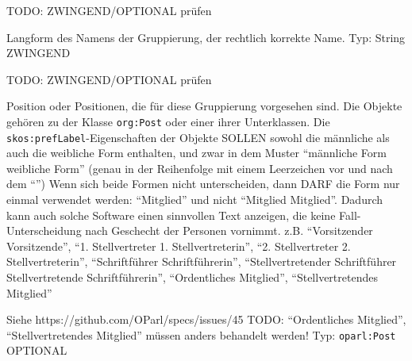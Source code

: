 \documentclass[,a4paper]{article}
\begin{document}
TODO: ZWINGEND/OPTIONAL prüfen

\begin{description}
\itemsep1pt\parskip0pt
\item[\texttt{nameLong}]
Langform des Namens der Gruppierung, der rechtlich korrekte Name. Typ:
String ZWINGEND
\end{description}

TODO: ZWINGEND/OPTIONAL prüfen

\begin{description}
\itemsep1pt\parskip0pt
\item[\texttt{post}]
Position oder Positionen, die für diese Gruppierung vorgesehen sind. Die
Objekte gehören zu der Klasse \texttt{org:Post} oder einer ihrer
Unterklassen. Die \texttt{skos:prefLabel}-Eigenschaften der Objekte
SOLLEN sowohl die männliche als auch die weibliche Form enthalten, und
zwar in dem Muster ``männliche Form \textbar{} weibliche Form'' (genau
in der Reihenfolge mit einem Leerzeichen vor und nach dem
``\textbar{}'') Wenn sich beide Formen nicht unterscheiden, dann DARF
die Form nur einmal verwendet werden: ``Mitglied'' und nicht ``Mitglied
\textbar{} Mitglied''. Dadurch kann auch solche Software einen
sinnvollen Text anzeigen, die keine Fall-Unterscheidung nach Geschecht
der Personen vornimmt. z.B. ``Vorsitzender \textbar{} Vorsitzende'',
``1. Stellvertreter \textbar{} 1. Stellvertreterin'', ``2.
Stellvertreter \textbar{} 2. Stellvertreterin'', ``Schriftführer
\textbar{} Schriftführerin'', ``Stellvertretender Schriftführer
\textbar{} Stellvertretende Schriftführerin'', ``Ordentliches
Mitglied'', ``Stellvertretendes Mitglied''
\end{description}

Siehe https://github.com/OParl/specs/issues/45 TODO: ``Ordentliches
Mitglied'', ``Stellvertretendes Mitglied'' müssen anders behandelt
werden! Typ: \texttt{oparl:Post} OPTIONAL
\end{document}
